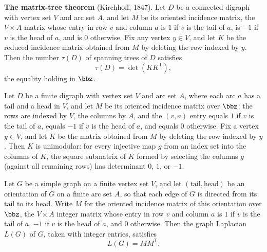\begin{theorem}
\label{CycleSpace.matrix_tree_theorem}
\textbf{The matrix-tree theorem} (Kirchhoff, 1847). Let $D$ be a connected digraph with
vertex set $V$ and arc set $A$, and let $M$ be its oriented incidence matrix, the $V
\times A$ matrix whose entry in row $v$ and column $a$ is $1$ if $v$ is the tail of $a$,
is $-1$ if $v$ is the head of $a$, and is $0$ otherwise. Fix any vertex $y \in V$, and
let $K$ be the reduced incidence matrix obtained from $M$ by deleting the row indexed by
$y$. Then the number $\tau(D)$ of spanning trees of $D$ satisfies \[ \tau(D) =
\det\!\left(K K^{\mathsf{T}}\right), \] the equality holding in $\bbz$.
\end{theorem}

\begin{theorem}
\label{CycleSpace.isUnimodular_deleteRow}
\leanok
{}
Let $D$ be a finite digraph with vertex set $V$ and arc set $A$, where each arc $a$ has
a tail and a head in $V$, and let $M$ be its oriented incidence matrix over $\bbz$: the
rows are indexed by $V$, the columns by $A$, and the $(v,a)$ entry equals $1$ if $v$ is
the tail of $a$, equals $-1$ if $v$ is the head of $a$, and equals $0$ otherwise. Fix a
vertex $y \in V$, and let $K$ be the matrix obtained from $M$ by deleting the row
indexed by $y$. Then $K$ is unimodular: for every injective map $g$ from an index set
into the columns of $K$, the square submatrix of $K$ formed by selecting the columns $g$
(against all remaining rows) has determinant $0$, $1$, or $-1$.
\end{theorem}

\begin{theorem}
\label{CycleSpace.lapMatrix_eq_orientedIncMatrix_mul_transpose}
\leanok
{}
Let $G$ be a simple graph on a finite vertex set $V$, and let $(\mathrm{tail},
\mathrm{head})$ be an orientation of $G$ on a finite arc set $A$, so that each edge of
$G$ is directed from its tail to its head. Write $M$ for the oriented incidence matrix
of this orientation over $\bbz$, the $V \times A$ integer matrix whose entry in row $v$
and column $a$ is $1$ if $v$ is the tail of $a$, $-1$ if $v$ is the head of $a$, and $0$
otherwise. Then the graph Laplacian $L(G)$ of $G$, taken with integer entries, satisfies
\[
L(G) = M M^{\mathsf{T}}.
\]
\end{theorem}

